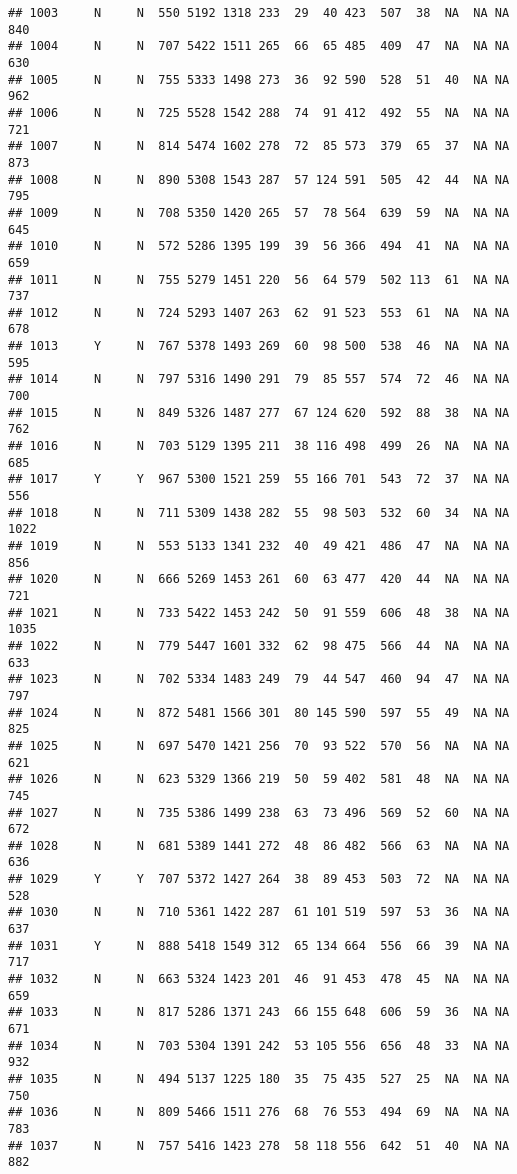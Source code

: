 \documentclass[]{article}
\begin{document}
\begin{verbatim}
## 1003     N     N  550 5192 1318 233  29  40 423  507  38  NA  NA NA  840
## 1004     N     N  707 5422 1511 265  66  65 485  409  47  NA  NA NA  630
## 1005     N     N  755 5333 1498 273  36  92 590  528  51  40  NA NA  962
## 1006     N     N  725 5528 1542 288  74  91 412  492  55  NA  NA NA  721
## 1007     N     N  814 5474 1602 278  72  85 573  379  65  37  NA NA  873
## 1008     N     N  890 5308 1543 287  57 124 591  505  42  44  NA NA  795
## 1009     N     N  708 5350 1420 265  57  78 564  639  59  NA  NA NA  645
## 1010     N     N  572 5286 1395 199  39  56 366  494  41  NA  NA NA  659
## 1011     N     N  755 5279 1451 220  56  64 579  502 113  61  NA NA  737
## 1012     N     N  724 5293 1407 263  62  91 523  553  61  NA  NA NA  678
## 1013     Y     N  767 5378 1493 269  60  98 500  538  46  NA  NA NA  595
## 1014     N     N  797 5316 1490 291  79  85 557  574  72  46  NA NA  700
## 1015     N     N  849 5326 1487 277  67 124 620  592  88  38  NA NA  762
## 1016     N     N  703 5129 1395 211  38 116 498  499  26  NA  NA NA  685
## 1017     Y     Y  967 5300 1521 259  55 166 701  543  72  37  NA NA  556
## 1018     N     N  711 5309 1438 282  55  98 503  532  60  34  NA NA 1022
## 1019     N     N  553 5133 1341 232  40  49 421  486  47  NA  NA NA  856
## 1020     N     N  666 5269 1453 261  60  63 477  420  44  NA  NA NA  721
## 1021     N     N  733 5422 1453 242  50  91 559  606  48  38  NA NA 1035
## 1022     N     N  779 5447 1601 332  62  98 475  566  44  NA  NA NA  633
## 1023     N     N  702 5334 1483 249  79  44 547  460  94  47  NA NA  797
## 1024     N     N  872 5481 1566 301  80 145 590  597  55  49  NA NA  825
## 1025     N     N  697 5470 1421 256  70  93 522  570  56  NA  NA NA  621
## 1026     N     N  623 5329 1366 219  50  59 402  581  48  NA  NA NA  745
## 1027     N     N  735 5386 1499 238  63  73 496  569  52  60  NA NA  672
## 1028     N     N  681 5389 1441 272  48  86 482  566  63  NA  NA NA  636
## 1029     Y     Y  707 5372 1427 264  38  89 453  503  72  NA  NA NA  528
## 1030     N     N  710 5361 1422 287  61 101 519  597  53  36  NA NA  637
## 1031     Y     N  888 5418 1549 312  65 134 664  556  66  39  NA NA  717
## 1032     N     N  663 5324 1423 201  46  91 453  478  45  NA  NA NA  659
## 1033     N     N  817 5286 1371 243  66 155 648  606  59  36  NA NA  671
## 1034     N     N  703 5304 1391 242  53 105 556  656  48  33  NA NA  932
## 1035     N     N  494 5137 1225 180  35  75 435  527  25  NA  NA NA  750
## 1036     N     N  809 5466 1511 276  68  76 553  494  69  NA  NA NA  783
## 1037     N     N  757 5416 1423 278  58 118 556  642  51  40  NA NA  882

\end{verbatim}
\end{document}
